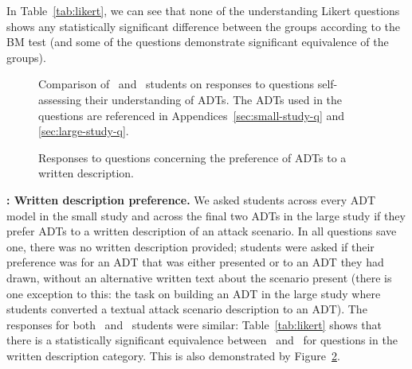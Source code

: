In Table~\ref{tab:likert}, we can see that none of the understanding Likert questions shows any statistically significant difference between the groups according to the BM test (and some of the questions demonstrate significant equivalence of the groups). 






\begin{figure}[t]
    \caption{Comparison of \ICS\ and \SEC\ students on responses to questions self-assessing their understanding of ADTs. The ADTs used in the questions are referenced in Appendices~\ref{sec:small-study-q} and \ref{sec:large-study-q}.}
    \label{img:likert-understanding}
\end{figure}



\begin{figure}[t]
    \caption{Responses to questions concerning the preference of ADTs to a written description.}
    \label{fig:likert-written}
\end{figure}


\textbf{\hypothesis{\hypoWrittenComparison}: Written description preference.}
We asked students across every ADT model in the small study and across the final two ADTs in the large study if they prefer ADTs to a written description of an attack scenario. In all questions save one, there was no written description provided; students were asked if their preference was for an ADT that was either presented or to an ADT they had drawn, without an alternative written text about the scenario present (there is one exception to this: the task on building an ADT in the large study where students converted a textual attack scenario description to an ADT). The responses for both \ICS\ and \SEC\ students were similar: Table~\ref{tab:likert} shows that there is a statistically significant equivalence between \ICS\ and \SEC\ for questions in the written description category. This is also demonstrated by Figure~\ref{fig:likert-written}.




